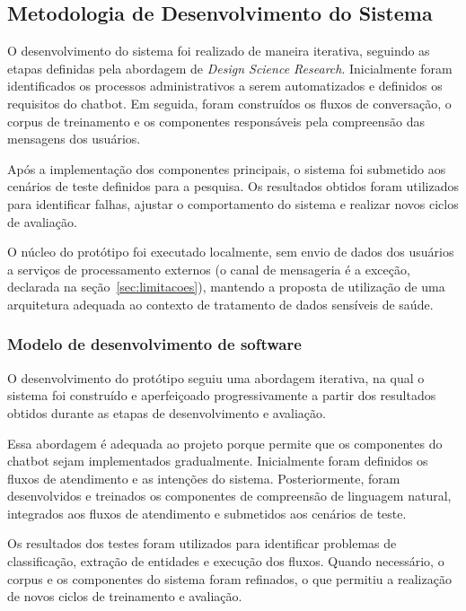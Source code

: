 \documentclass[12pt,a4paper]{extarticle}
\begin{document}
\subsection{Metodologia de Desenvolvimento do Sistema}

O desenvolvimento do sistema foi realizado de maneira iterativa, seguindo as etapas definidas pela abordagem de \textit{Design Science Research}. Inicialmente foram identificados os processos administrativos a serem automatizados e definidos os requisitos do chatbot. Em seguida, foram construídos os fluxos de conversação, o corpus de treinamento e os componentes responsáveis pela compreensão das mensagens dos usuários.

Após a implementação dos componentes principais, o sistema foi submetido aos cenários de teste definidos para a pesquisa. Os resultados obtidos foram utilizados para identificar falhas, ajustar o comportamento do sistema e realizar novos ciclos de avaliação.

O núcleo do protótipo foi executado localmente, sem envio de dados dos usuários a serviços de processamento externos (o canal de mensageria é a exceção, declarada na seção~\ref{sec:limitacoes}), mantendo a proposta de utilização de uma arquitetura adequada ao contexto de tratamento de dados sensíveis de saúde.

\subsubsection{Modelo de desenvolvimento de software}

O desenvolvimento do protótipo seguiu uma abordagem iterativa, na qual o sistema foi construído e aperfeiçoado progressivamente a partir dos resultados obtidos durante as etapas de desenvolvimento e avaliação.

Essa abordagem é adequada ao projeto porque permite que os componentes do chatbot sejam implementados gradualmente. Inicialmente foram definidos os fluxos de atendimento e as intenções do sistema. Posteriormente, foram desenvolvidos e treinados os componentes de compreensão de linguagem natural, integrados aos fluxos de atendimento e submetidos aos cenários de teste.

Os resultados dos testes foram utilizados para identificar problemas de classificação, extração de entidades e execução dos fluxos. Quando necessário, o corpus e os componentes do sistema foram refinados, o que permitiu a realização de novos ciclos de treinamento e avaliação.
\end{document}
